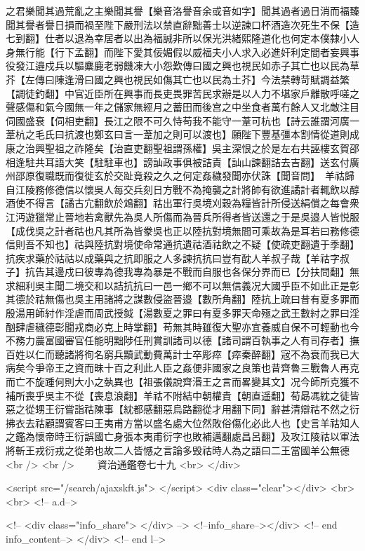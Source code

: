 之君樂聞其過荒亂之主樂聞其譽【樂音洛譽音余或音如字】聞其過者過日消而福臻聞其譽者譽日損而禍至陛下嚴刑法以禁直辭黜善士以逆諫口杯酒造次死生不保【造七到翻】仕者以退為幸居者以出為福誠非所以保光洪緒熙隆道化也何定本僕隸小人身無行能【行下孟翻】而陛下愛其佞媚假以威福夫小人求入必進奸利定間者妄興事役發江邉戍兵以驅麋鹿老弱饑凍大小怨歎傳曰國之興也視民如赤子其亡也以民為草芥【左傳曰陳逢滑曰國之興也視民如傷其亡也以民為土芥】今法禁轉苛賦調益繁【調徒釣翻】中官近臣所在興事而長吏畏罪苦民求辦是以人力不堪家戶離散呼嗟之聲感傷和氣今國無一年之儲家無經月之蓄田而後宫之中坐食者萬冇餘人又北敵注目伺國盛衰【伺相吏翻】長江之限不可久恃苟我不能守一葦可杭也【詩云誰謂河廣一葦杭之毛氏曰抗渡也鄭玄曰言一葦加之則可以渡也】願陛下豐基彊本割情從道則成康之治興聖祖之祚隆矣【治直吏翻聖祖謂孫權】吳主深恨之於是左右共誣樓玄賀邵相逢駐共耳語大笑【駐駐車也】謗訕政事俱被詰責【訕山諫翻詰去吉翻】送玄付廣州邵原復職既而復徙玄於交趾竟殺之久之何定姦穢發聞亦伏誅【聞音問】　羊祜歸自江陵務修德信以懷吳人每交兵刻日方戰不為掩襲之計將帥有欲進譎計者輒飲以醇酒使不得言【譎古宂翻飲於鴆翻】祜出軍行吳境刈穀為糧皆計所侵送絹償之每會衆江沔遊獵常止晉地若禽獸先為吳人所傷而為晉兵所得者皆送還之于是吳邉人皆悦服【成伐吳之計者祜也凡其所為皆豢吳也正以陸抗對境無間可乘故為是耳若曰務修德信則吾不知也】祜與陸抗對境使命常通抗遺祜酒祜飲之不疑【使疏吏翻遺于季翻】抗疾求藥於祜祜以成藥與之抗即服之人多諫抗抗曰豈有酖人羊叔子哉【羊祜字叔子】抗告其邊戍曰彼專為德我專為暴是不戰而自服也各保分界而已【分扶問翻】無求細利吳主聞二境交和以詰抗抗曰一邑一鄉不可以無信義况大國乎臣不如此正是彰其德於祜無傷也吳主用諸將之謀數侵盜晉邉【數所角翻】陸抗上疏曰昔有夏多罪而殷湯用師紂作淫虐而周武授鉞【湯數夏之罪曰有夏多罪天命殛之武王數紂之罪曰淫酗肆虐穢德彰聞戎商必克上時掌翻】苟無其時雖復大聖亦宜養威自保不可輕動也今不務力農富國審官任能明黜陟任刑賞訓諸司以德【諸司謂百執事之人有司存者】撫百姓以仁而聽諸將徇名窮兵黷武動費萬計士卒彫瘁【瘁秦醉翻】宼不為衰而我已大病矣今爭帝王之資而昧十百之利此人臣之姦便非國家之良策也昔齊魯三戰魯人再克而亡不旋踵何則大小之埶異也【祖張儀說齊湣王之言而畧變其文】况今師所克獲不補所喪乎吳主不從【喪息浪翻】羊祜不附結中朝權貴【朝直遥翻】荀勗馮紞之徒皆惡之從甥王衍嘗詣祜陳事【紞都感翻惡烏路翻從才用翻下同】辭甚清辯祜不然之衍拂衣去祜顧謂賓客曰王夷甫方當以盛名處大位然敗俗傷化必此人也【史言羊祜知人之鑑為懷帝時王衍誤國亡身張本夷甫衍字也敗補邁翻處昌呂翻】及攻江陵祜以軍法將斬王戎衍戎之從弟也故二人皆憾之言論多毁祜時人為之語曰二王當國羊公無德<br />
<br />
　　資治通鑑卷七十九  <br>
   </div> 

<script src="/search/ajaxskft.js"> </script>
 <div class="clear"></div>
<br>
<br>
 <!-- a.d-->

 <!--
<div class="info_share">
</div> 
-->
 <!--info_share--></div>   <!-- end info_content-->
  </div> <!-- end l-->

